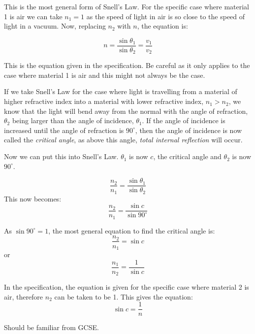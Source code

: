 \documentclass[main.tex]{subfiles}
\begin{document}
This is the most general form of Snell's Law. For the specific case where material 1 is air we can take $n_1 = 1$ as the speed of light in air is so close to the speed of light in a vacuum. Now, replacing $n_2$ with $n$, the equation is:

\[ n = \frac{\sin{\theta_1}}{\sin{\theta_2}} = \frac{v_1}{v_2}\]

This is the equation given in the specification. Be careful as it only applies to the case where material 1 is air and this might not always be the case.


If we take Snell's Law for the case where light is travelling from a material of higher refractive index into a material with lower refractive index, $n_1 > n_2$, we know that the light will bend away from the normal with the angle of refraction, $\theta_2$ being larger than the angle of incidence, $\theta_1$. If the angle of incidence is increased until the angle of refraction is $90^{\circ}$, then the angle of incidence is now called the \emph{critical angle}, as above this angle, \emph{total internal reflection} will occur.

Now we can put this into Snell's Law. $\theta_1$ is now $c$, the critical angle and $\theta_2$ is now $90^{\circ}$.

$$\frac{n_2}{n_1} = \frac{\sin{\theta_1}}{\sin{\theta_2}}$$
This now becomes:
$$\frac{n_2}{n_1} = \frac{\sin{c}}{\sin{90^{\circ}}}$$

As $\sin{90^{\circ}} = 1$, the most general equation to find the critical angle is:
$$\frac{n_2}{n_1} = \sin{c}$$
or
$$\frac{n_1}{n_2} = \frac{1}{\sin{c}}$$

In the specification, the equation is given for the specific case where material 2 is air, therefore $n_2$ can be taken to be 1. This gives the equation: 
$$\sin{c} = \frac{1}{n}$$


Should be familiar from GCSE.
\end{document}
